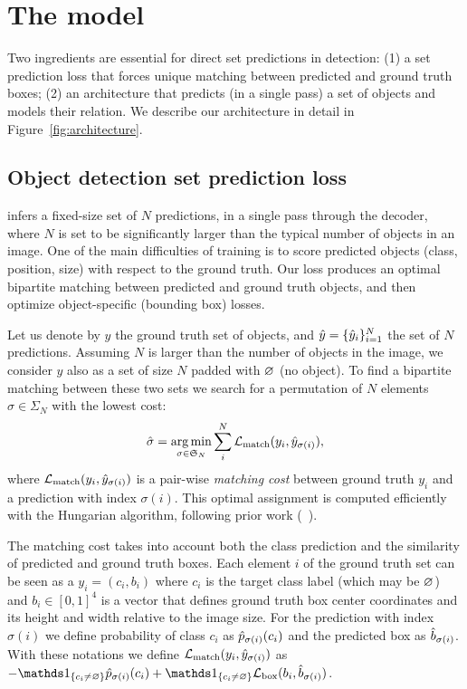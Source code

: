 \section{The \detr model}

Two ingredients are essential for direct set predictions in detection: (1) a set prediction loss that %
forces unique matching between predicted and ground truth boxes; (2) an architecture that predicts (in a single pass) a set of objects and models their relation. We describe our architecture in detail in Figure~\ref{fig:architecture}.



\subsection{Object detection set prediction loss}
\label{sec:set_loss}



\detr infers a fixed-size set of $N$ predictions, in a single pass through the decoder, where $N$ is set to be significantly larger than the typical number of objects in an image. One of the main difficulties of training is to score predicted objects (class, position, size) with respect to the ground truth. Our loss produces an optimal bipartite matching between predicted and ground truth objects, and then optimize object-specific (bounding box) losses.

Let us denote by $y$ the ground truth set of objects, and $\hat{y} = \{\hat{y}_i\}_{i=1}^{N}$ the set of $N$ predictions.
Assuming $N$ is larger than the number of objects in the image,
we consider $y$ also as a set of size $N$ padded with $\varnothing$ (no object).
To find a bipartite matching between these two sets we search for a permutation of $N$ elements $\sigma \in \Sigma_N$ with the lowest cost:
\begin{equation}
\label{eq:matching}
    \hat{\sigma} = \operatorname*{arg\,min}_{\sigma\in\mathfrak{S}_N} \sum_{i}^{N} {\cal L}_{\rm match}(y_i, \hat{y}_{\sigma(i)}),
\end{equation}
where ${\cal L}_{\rm match}(y_i, \hat{y}_{\sigma(i)})$ is a pair-wise \emph{matching cost} between ground truth $y_i$ and a prediction with index $\sigma(i)$. This optimal assignment is computed efficiently with the Hungarian algorithm, following prior work (\eg ~\cite{Stewart2015EndtoEndPD}).

The matching cost takes into account both the class prediction and the similarity of predicted and ground truth boxes. Each element $i$ of the ground truth set can be seen as a $y_i = (c_i, b_i)$ where $c_i$ is the target class label (which may be $\varnothing$) and $b_i \in [0, 1]^4$ is a vector that defines ground truth box center coordinates and its height and width relative to the image size. For the prediction with index $\sigma(i)$ we define probability of class $c_i$ as $\hat{p}_{\sigma(i)}(c_i)$ and the predicted box as $\hat{b}_{\sigma(i)}$. With these notations we define
${\cal L}_{\rm match}(y_i, \hat{y}_{\sigma(i)})$ as $-\indic{c_i\neq\noobject}\hp_{\sigma(i)}(c_i) + \indic{c_i\neq\noobject} \bloss{b_{i}, \hb_{\sigma(i)}}$.


